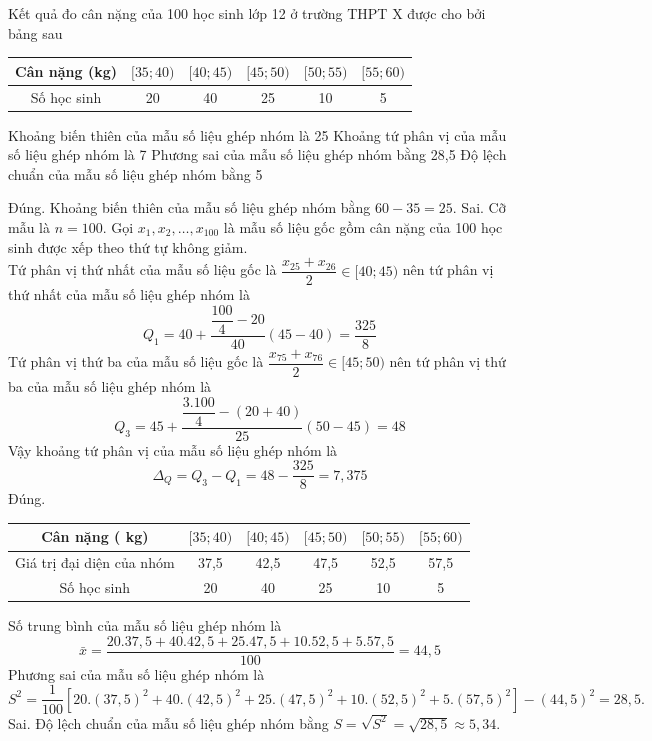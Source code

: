 \begin{ex}%
	Kết quả đo cân nặng của 100 học sinh lớp 12 ở trường THPT X được cho bởi bảng sau
	\begin{center}
		\begin{tabular}{|c|c|c|c|c|c|}
			\hline
			Cân nặng (kg) & {$[35; 40)$} & {$[40; 45)$} & {$[45; 50)$} & {$[50; 55)$} & {$[55; 60)$} \\
			\hline
			Số học sinh & 20 & 40 & 25 & 10 & 5 \\
			\hline
		\end{tabular}
	\end{center}
	\choiceTF
	{\True Khoảng biến thiên của mẫu số liệu ghép nhóm là 25}
	{Khoảng tứ phân vị của mẫu số liệu ghép nhóm là 7}
	{\True Phương sai của mẫu số liệu ghép nhóm bằng 28,5}
	{Độ lệch chuẩn của mẫu số liệu ghép nhóm bằng 5}
	\loigiai
	{
		\begin{itemchoice}
			\itemch Đúng. Khoảng biến thiên của mẫu số liệu ghép nhóm bằng $60-35=25$.
			\itemch Sai. Cỡ mẫu là $n=100$. Gọi $x_1, x_2, \ldots, x_{100}$ là mẫu số liệu gốc gồm cân nặng của 100 học sinh được xếp theo thứ tự không giảm. \\
			Tứ phân vị thứ nhất của mẫu số liệu gốc là $\dfrac{x_{25}+x_{26}}{2} \in[40; 45)$ nên tứ phân vị thứ nhất của mẫu số liệu ghép nhóm là
			$$
			Q_{1}=40+\dfrac{\dfrac{100}{4}-20}{40}(45-40)=\dfrac{325}{8}
			$$
			Tứ phân vị thứ ba của mẫu số liệu gốc là $\dfrac{{x}_{75}+{x}_{76}}{2} \in[45 ; 50)$ nên tứ phân vị thứ ba của mẫu số liệu ghép nhóm là
			$$
			{Q}_{3}=45+\dfrac{\dfrac{3.100}{4}-(20+40)}{25}(50-45)=48
			$$
			Vậy khoảng tứ phân vị của mẫu số liệu ghép nhóm  là $$\Delta_{Q}=Q_{3}-Q_{1}=48-\dfrac{325}{8}=7{,}375$$
			\itemch Đúng. 
			\begin{center}
				\begin{tabular}{|c|c|c|c|c|c|}
					\hline Cân nặng ( kg) & {$[35 ; 40)$} & {$[40 ; 45)$} & {$[45 ; 50)$} & {$[50 ; 55)$} & {$[55 ; 60)$} \\
					\hline Giá trị đại diện của nhóm & 37{,}5 & 42{,}5 & 47{,}5 & 52{,}5 & 57{,}5 \\
					\hline Số học sinh & 20 & 40 & 25 & 10 & 5 \\
					\hline
				\end{tabular}
			\end{center}
			Số trung bình của mẫu số liệu ghép nhóm là
			$$
			\bar{x}=\dfrac{20.37{,}5+40.42{,}5+25.47{,}5+10.52{,}5+5.57{,}5}{100}=44{,}5
			$$
			Phương sai của mẫu số liệu ghép nhóm là
			$$S^{2}=\dfrac{1}{100}\left[20 .(37{,}5)^{2}+40 .(42{,}5)^{2}+25 .(47{,}5)^{2}+10 .(52{,}5)^{2}+5 .(57{,}5)^{2}\right]-(44{,}5)^{2}=28{,}5.$$
			\itemch Sai. Độ lệch chuẩn của mẫu số liệu ghép nhóm bằng ${S}=\sqrt{{S}^{2}}=\sqrt{28,5} \approx 5,34$.
		\end{itemchoice}
	}
\end{ex}


